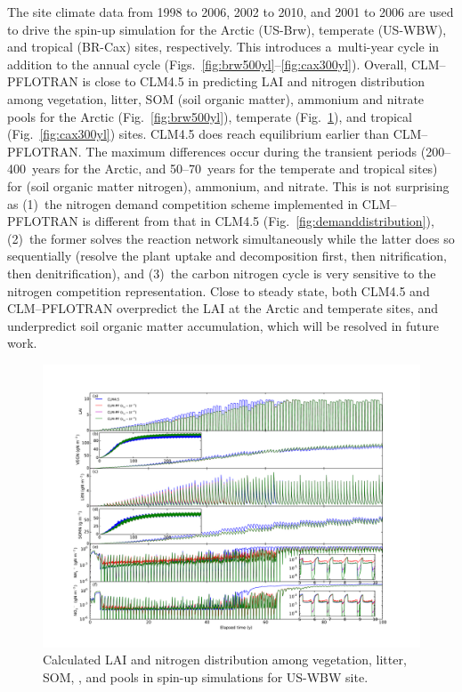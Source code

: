 \documentclass[gmd,noline]{copernicus}
\begin{document}
      The site climate data from 1998 to 2006, 2002 to 2010, and 2001 to
      2006 are used to drive the spin-up simulation for the Arctic (US-Brw),
      temperate (US-WBW), and tropical (BR-Cax) sites, respectively. This
      introduces a~multi-year cycle in addition to the annual cycle
      (Figs.~\ref{fig:brw500yl}--\ref{fig:cax300yl}). Overall, CLM--PFLOTRAN
      is close to CLM4.5 in predicting LAI and nitrogen distribution among
      vegetation, litter, SOM (soil organic matter), ammonium and nitrate
      pools for the Arctic (Fig.~\ref{fig:brw500yl}), temperate
      (Fig.~\ref{fig:pit300yl}), and tropical (Fig.~\ref{fig:cax300yl})
      sites. CLM4.5 does reach equilibrium earlier than CLM--PFLOTRAN. The
      maximum differences occur during the transient periods (200--400~years
      for the Arctic, and 50--70~years for the temperate and tropical
      sites) for  (soil organic matter nitrogen), ammonium, and
      nitrate. This is not surprising as (1)~the nitrogen demand competition
      scheme implemented in CLM--PFLOTRAN is different from that in CLM4.5
      (Fig.~\ref{fig:demanddistribution}), (2)~the former solves the
      reaction network simultaneously while the latter does so sequentially
      (resolve the plant uptake and decomposition first, then nitrification,
      then denitrification), and (3)~the carbon nitrogen cycle is very
      sensitive to the nitrogen competition representation. Close to steady
      state, both CLM4.5 and CLM--PFLOTRAN overpredict the LAI at the Arctic
      and temperate sites, and underpredict soil organic matter
      accumulation, which will be resolved in future work.

\begin{figure}[t]
\includegraphics[width=130mm]{gmd-2015-254-f05.pdf}
\caption{Calculated LAI and nitrogen distribution among vegetation, litter,
SOM, , and  pools in spin-up simulations for US-WBW
site.} \label{fig:pit300yl}
\end{figure}
\end{document}
